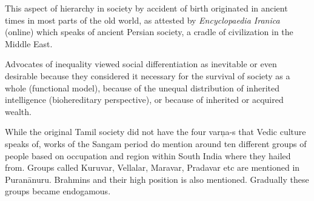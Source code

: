 This aspect of hierarchy in society by accident of birth originated in ancient times in most parts of the old world, as attested by \textit{Encyclopaedia Iranica} (online) which speaks of ancient Persian society, a cradle of civilization in the Middle East.


\begin{myquote}
Advocates of inequality viewed social differentiation as inevitable or even desirable because they considered it necessary for the survival of society as a whole (functional model), because of the unequal distribution of inherited intelligence (biohereditary perspective), or because of inherited or acquired wealth.
\end{myquote}

While the original Tamil society did not have the four varņa-s that Vedic culture speaks of, works of the Sangam period do mention around ten different groups of people based on occupation and region within South India where they hailed from. Groups called Kuruvar, Vellalar, Maravar, Pradavar etc are mentioned in Puranānuru. Brahmins and their high position is also mentioned. Gradually these groups became endogamous.

